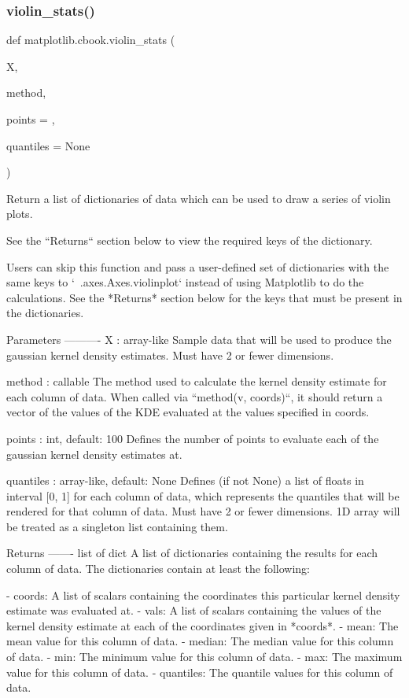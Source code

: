 \subsubsection{\texorpdfstring{violin\+\_\+stats()}{violin\_stats()}}
{\footnotesize\ttfamily def matplotlib.\+cbook.\+violin\+\_\+stats (\begin{DoxyParamCaption}\item[{}]{X,  }\item[{}]{method,  }\item[{}]{points = {},  }\item[{}]{quantiles = {\ttfamily None} }\end{DoxyParamCaption})}

\begin{DoxyVerb}Return a list of dictionaries of data which can be used to draw a series
of violin plots.

See the ``Returns`` section below to view the required keys of the
dictionary.

Users can skip this function and pass a user-defined set of dictionaries
with the same keys to `~.axes.Axes.violinplot` instead of using Matplotlib
to do the calculations. See the *Returns* section below for the keys
that must be present in the dictionaries.

Parameters
----------
X : array-like
    Sample data that will be used to produce the gaussian kernel density
    estimates. Must have 2 or fewer dimensions.

method : callable
    The method used to calculate the kernel density estimate for each
    column of data. When called via ``method(v, coords)``, it should
    return a vector of the values of the KDE evaluated at the values
    specified in coords.

points : int, default: 100
    Defines the number of points to evaluate each of the gaussian kernel
    density estimates at.

quantiles : array-like, default: None
    Defines (if not None) a list of floats in interval [0, 1] for each
    column of data, which represents the quantiles that will be rendered
    for that column of data. Must have 2 or fewer dimensions. 1D array will
    be treated as a singleton list containing them.

Returns
-------
list of dict
    A list of dictionaries containing the results for each column of data.
    The dictionaries contain at least the following:

    - coords: A list of scalars containing the coordinates this particular
      kernel density estimate was evaluated at.
    - vals: A list of scalars containing the values of the kernel density
      estimate at each of the coordinates given in *coords*.
    - mean: The mean value for this column of data.
    - median: The median value for this column of data.
    - min: The minimum value for this column of data.
    - max: The maximum value for this column of data.
    - quantiles: The quantile values for this column of data.
\end{DoxyVerb}
